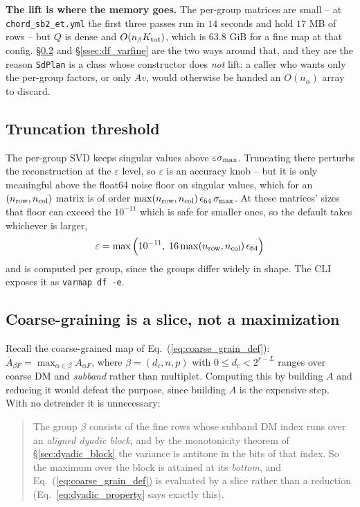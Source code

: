 \documentclass{article}
\numberwithin{equation}{section}   %
\begin{document}
{\bf The lift is where the memory goes.} The per-group matrices are small -- at
{\tt chord\_sb2\_et.yml} the first three passes run in $14$ seconds and hold $17$ MB of rows --
but $Q$ is dense and $O(n_\beta K_{\rm tot})$, which is $63.8$ GiB for a fine map at that config.
\S\ref{ssec:df_coarse} and \S\ref{ssec:df_varfine} are the two ways around that, and they are the
reason \verb|SdPlan| is a class whose constructor does {\em not} lift: a caller who wants only
the per-group factors, or only $Av$, would otherwise be handed an $O(n_\alpha)$ array to discard.

\subsection{Truncation threshold}
\label{ssec:df_epsilon}

The per-group SVD keeps singular values above $\varepsilon \sigma_{\rm max}$. Truncating there
perturbs the reconstruction at the $\varepsilon$ level, so $\varepsilon$ is an accuracy knob --
but it is only meaningful above the float64 noise floor on singular values, which for an
$(n_{\rm row}, n_{\rm col})$ matrix is of order $\max(n_{\rm row}, n_{\rm col}) \, \epsilon_{64}
\, \sigma_{\rm max}$. At these matrices' sizes that floor can exceed the $10^{-11}$ which is safe
for smaller ones, so the default takes whichever is larger,
\begin{equation}
\varepsilon = \max\Big( 10^{-11}, \; 16 \max(n_{\rm row}, n_{\rm col}) \, \epsilon_{64} \Big)
  \label{eq:df_epsilon}
\end{equation}
and is computed per group, since the groups differ widely in shape. The CLI exposes it as
{\tt varmap df -e}.

\subsection{Coarse-graining is a slice, not a maximization}
\label{ssec:df_coarse}

Recall the coarse-grained map of Eq.\ (\ref{eq:coarse_grain_def}): $\bar A_{\beta F} =
\max_{\alpha \in \beta} A_{\alpha F}$, where $\beta = (d_c, n, p)$ with
$0 \le d_c < 2^{r-L}$ ranges over coarse DM and {\em subband} rather than multiplet. Computing
this by building $A$ and reducing it would defeat the purpose, since building $A$ is the
expensive step. With no detrender it is unnecessary:

\begin{quote}
The group $\beta$ consists of the fine rows whose subband DM index runs over an {\em aligned
dyadic block}, and by the monotonicity theorem of \S\ref{sec:dyadic_block} the variance is
antitone in the bits of that index. So the maximum over the block is attained at its
{\em bottom}, and Eq.\ (\ref{eq:coarse_grain_def}) is evaluated by a slice rather than a
reduction (Eq.\ \ref{eq:dyadic_property} says exactly this).
\end{quote}
\end{document}
